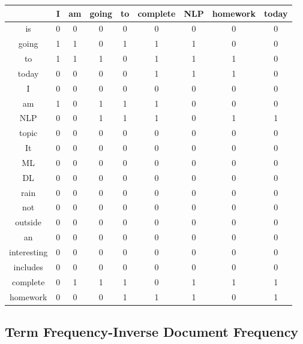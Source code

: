 \begin{center}
\begin{tabular}{||c|| c c c c c c c c||}
\hline
&I & am	 & going & to & complete & NLP & homework & today\\
\hline
is		&0&0&0&0&0&0&0&0 \\
going		&1&1&0&1&1&1&0&0\\
to		&1&1&1&0&1&1&1&0\\
today		&0&0&0&0&1&1&1&0\\
I		&0&0&0&0&0&0&0&0\\
am		&1&0&1&1&1&0&0&0\\
NLP		&0&0&1&1&1&0&1&1\\
topic		&0&0&0&0&0&0&0&0\\
It		&0&0&0&0&0&0&0&0\\
ML		&0&0&0&0&0&0&0&0\\
DL		&0&0&0&0&0&0&0&0\\
rain		&0&0&0&0&0&0&0&0\\
not		&0&0&0&0&0&0&0&0\\
outside		&0&0&0&0&0&0&0&0\\
an		&0&0&0&0&0&0&0&0\\
interesting	&0&0&0&0&0&0&0&0\\
includes	&0&0&0&0&0&0&0&0\\
complete	&0&1&1&1&0&1&1&1\\
homework	&0&0&0&1&1&1&0&1\\
\hline
\end{tabular}
\end{center}
\subsection{Term Frequency-Inverse Document Frequency}
